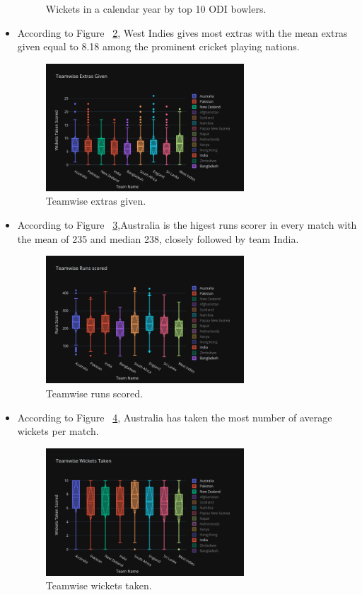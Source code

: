 \documentclass[fleqn,10pt]{wlscirep}
\begin{document}
\begin{itemize}
\begin{figure}[H]
        \caption{Wickets in a calendar year by top 10 ODI bowlers.}
        \label{fig:seven}
      \end{figure}
      \item According to Figure ~\ref{fig:eight}, West Indies gives most extras with the mean extras given equal to 8.18 among the prominent cricket playing nations.
      \begin{figure}[H]
        \centering
        \includegraphics[width=0.7\textwidth]{teamextras.png}
        \caption{Teamwise extras given. }
        \label{fig:eight}
      \end{figure}
      \item According to Figure ~\ref{fig:nine},Australia is the higest runs scorer in every match with the mean of 235 and median 238, closely followed by team India.
      \begin{figure}[H]
        \centering
        \includegraphics[width=0.7\textwidth]{teamruns.png}
        \caption{Teamwise runs scored.}
        \label{fig:nine}
      \end{figure}
      \item According to Figure ~\ref{fig:ten}, Australia has taken the most number of average wickets per match.
      \begin{figure}[H]
        \centering
        \includegraphics[width=0.7\textwidth]{teamwic.png}
        \caption{Teamwise wickets taken.}
        \label{fig:ten}
      \end{figure}
      


\end{itemize}
\end{document}
